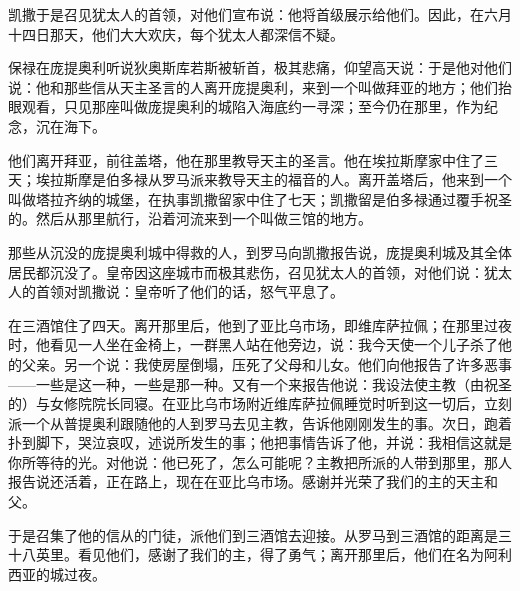 凯撒于是召见犹太人的首领，对他们宣布说：他将首级展示给他们。因此，在六月十四日那天，他们大大欢庆，每个犹太人都深信不疑。\par

保禄在庞提奥利听说狄奥斯库若斯被斩首，极其悲痛，仰望高天说：于是他对他们说：他和那些信从天主圣言的人离开庞提奥利，来到一个叫做拜亚的地方；他们抬眼观看，只见那座叫做庞提奥利的城陷入海底约一寻深；至今仍在那里，作为纪念，沉在海下。\par

他们离开拜亚，前往盖塔，他在那里教导天主的圣言。他在埃拉斯摩家中住了三天；埃拉斯摩是伯多禄从罗马派来教导天主的福音的人。离开盖塔后，他来到一个叫做塔拉齐纳的城堡，在执事凯撒留家中住了七天；凯撒留是伯多禄通过覆手祝圣的。然后从那里航行，沿着河流来到一个叫做三馆的地方。\par

那些从沉没的庞提奥利城中得救的人，到罗马向凯撒报告说，庞提奥利城及其全体居民都沉没了。皇帝因这座城市而极其悲伤，召见犹太人的首领，对他们说：犹太人的首领对凯撒说：皇帝听了他们的话，怒气平息了。\par

在三酒馆住了四天。离开那里后，他到了亚比乌市场，即维库萨拉佩；在那里过夜时，他看见一人坐在金椅上，一群黑人站在他旁边，说：我今天使一个儿子杀了他的父亲。另一个说：我使房屋倒塌，压死了父母和儿女。他们向他报告了许多恶事——一些是这一种，一些是那一种。又有一个来报告他说：我设法使主教（由祝圣的）与女修院院长同寝。在亚比乌市场附近维库萨拉佩睡觉时听到这一切后，立刻派一个从普提奥利跟随他的人到罗马去见主教，告诉他刚刚发生的事。次日，跑着扑到脚下，哭泣哀叹，述说所发生的事；他把事情告诉了他，并说：我相信这就是你所等待的光。对他说：他已死了，怎么可能呢？主教把所派的人带到那里，那人报告说还活着，正在路上，现在在亚比乌市场。感谢并光荣了我们的主的天主和父。\par

于是召集了他的信从的门徒，派他们到三酒馆去迎接。从罗马到三酒馆的距离是三十八英里。看见他们，感谢了我们的主，得了勇气；离开那里后，他们在名为阿利西亚的城过夜。\par

